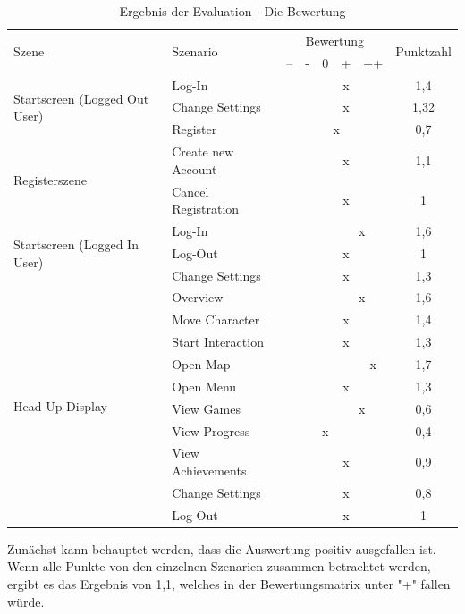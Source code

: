 			\begin{table}[htbp]
				\begin{tabular}{|l|l|c|c|c|c|c|c|}
					\hline
					\multirow{2}{*}{Szene} & \multirow{2}{*}{Szenario} &\multicolumn{5}{c}{Bewertung} \vline & \multirow{2}{*}{Punktzahl} \\ 
					& & -- & - & 0 & + & ++ & \\ \hline
					\multirow{3}{*}{Startscreen (Logged Out User)} & Log-In &  &  &  & x &  & 1,4 \\ 
					& Change Settings &  &  &  & x &  & 1,32 \\ 
					& Register &  &  &\multicolumn{2}{c}{x} \vline &  & 0,7 \\ \hline 
					\multirow{2}{*}{Registerszene} & Create new Account &  &  &  & x &  & 1,1 \\ 
					& Cancel Registration &  &  &  & x &  & 1 \\ \hline 
					\multirow{3}{*}{Startscreen (Logged In User)} & Log-In &  &  &  &\multicolumn{2}{c}{x} \vline & 1,6 \\ 
					& Log-Out &  &  &  & x &  & 1 \\ 
					& Change Settings &  &  &  & x &  & 1,3 \\ \hline 
					\multirow{10}{*}{Head Up Display} & Overview &  &  &  &\multicolumn{2}{c}{x} \vline & 1,6 \\  
					& Move Character &  &  &  & x &  & 1,4 \\  
					& Start Interaction &  &  &  & x &  & 1,3 \\  
					& Open Map &  &  &  &  & x & 1,7 \\  
					& Open Menu &  &  &  & x &  & 1,3 \\  
					& View Games &  &  &  &\multicolumn{2}{c}{x} \vline & 0,6 \\  
					& View Progress &  &  & x &  &  & 0,4 \\
					& View Achievements &  &  &  & x &  & 0,9 \\ 
					& Change Settings &  &  &  & x &  & 0,8 \\ 
					& Log-Out &  &  &  & x &  & 1 \\ 
					\hline
				\end{tabular}
				\caption{Ergebnis der Evaluation - Die Bewertung}
				\label{tab:ergbnisOverall}
			\end{table}
		
			Zunächst kann behauptet werden, dass die Auswertung positiv ausgefallen ist. Wenn alle Punkte von den einzelnen Szenarien zusammen betrachtet werden, ergibt es das Ergebnis von 1,1, welches in der Bewertungsmatrix unter "+" fallen würde.
			
